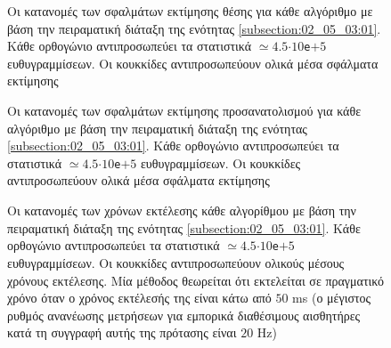 \begin{figure}\vspace{1cm}\hspace{0.5cm}
  
  \vspace{-4cm}
  \caption{\small Οι κατανομές των σφαλμάτων εκτίμησης θέσης για κάθε αλγόριθμο
           με βάση την πειραματική διάταξη της ενότητας
           \ref{subsection:02_05_03:01}. Κάθε ορθογώνιο αντιπροσωπεύει τα
           στατιστικά $\simeq 4.5$$\cdot$$10$\texttt{e}$+$$5$ ευθυγραμμίσεων.
           Οι κουκκίδες αντιπροσωπεύουν ολικά μέσα σφάλματα εκτίμησης}
  \label{fig:02_05_03:02:01}
\end{figure}

\begin{figure}\vspace{1cm}\hspace{0.5cm}
  
  \vspace{-4cm}
  \caption{\small Οι κατανομές των σφαλμάτων εκτίμησης προσανατολισμού για κάθε
           αλγόριθμο με βάση την πειραματική διάταξη της ενότητας
           \ref{subsection:02_05_03:01}. Κάθε ορθογώνιο αντιπροσωπεύει τα
           στατιστικά $\simeq 4.5$$\cdot$$10$\texttt{e}$+$$5$ ευθυγραμμίσεων.
           Οι κουκκίδες αντιπροσωπεύουν ολικά μέσα σφάλματα εκτίμησης}
  \label{fig:02_05_03:02:02}
\end{figure}

\begin{figure}\vspace{1cm}\hspace{0.5cm}
  
  \vspace{-4cm}
  \caption{\small Οι κατανομές των χρόνων εκτέλεσης κάθε
           αλγορίθμου με βάση την πειραματική διάταξη της ενότητας
           \ref{subsection:02_05_03:01}. Κάθε ορθογώνιο αντιπροσωπεύει τα
           στατιστικά $\simeq 4.5$$\cdot$$10$\texttt{e}$+$$5$ ευθυγραμμίσεων.
           Οι κουκκίδες αντιπροσωπεύουν ολικούς μέσους χρόνους εκτέλεσης.
           Μία μέθοδος θεωρείται ότι εκτελείται σε πραγματικό χρόνο όταν ο
           χρόνος εκτέλεσής της είναι κάτω από $50$ ms (ο μέγιστος ρυθμός
           ανανέωσης μετρήσεων για εμπορικά διαθέσιμους αισθητήρες κατά τη
           συγγραφή αυτής της πρότασης είναι $20$ Hz)}
  \label{fig:02_05_03:02:03}
\end{figure}

